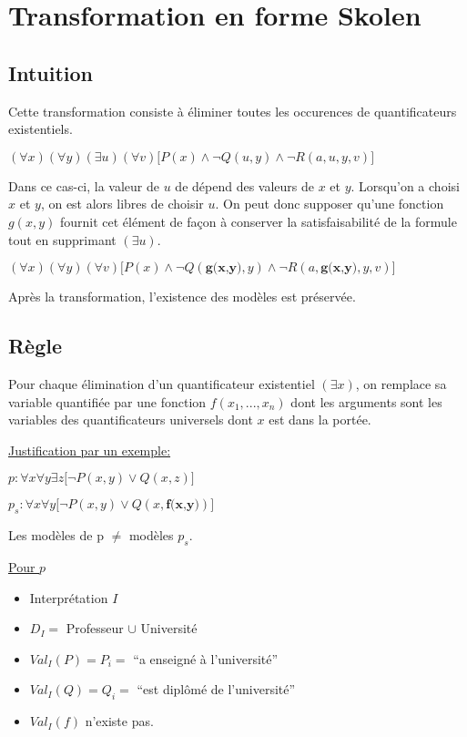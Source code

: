 \section{Transformation en forme Skolen}
\subsection{Intuition}

Cette transformation consiste à éliminer toutes les occurences de quantificateurs existentiels.
\smallskip

$(\forall x)(\forall y)(\exists u)(\forall v) \big[ P(x) \wedge \neg Q(u,y) \wedge \neg R(a,u,y,v) \big]$
\smallskip 


Dans ce cas-ci, la valeur de $u$ de dépend des valeurs de $x$ et $y$. Lorsqu'on a choisi $x$ et $y$, on est alors libres de choisir $u$.
On peut donc supposer qu'une fonction $g(x,y)$ fournit cet élément de façon à conserver la satisfaisabilité de la formule tout en supprimant $(\exists u)$.
\smallskip

$(\forall x)(\forall y)(\forall v) \big[ P(x) \wedge \neg Q(\textbf{g(x,y)},y) \wedge \neg R(a,\textbf{g(x,y)},y,v) \big]$
\smallskip

Après la transformation, l'existence des modèles est préservée.

\subsection{Règle}

Pour chaque élimination d'un quantificateur existentiel $(\exists x)$, on remplace sa variable quantifiée par une fonction $f(x_1,...,x_n)$ dont les arguments sont les variables des quantificateurs universels dont $x$ est dans la portée.
\smallskip

\underline{Justification par un exemple:}

$p: \forall x \forall y \exists z \big[ \neg P(x,y) \vee Q(x,z) \big]$
\smallskip

$p_s: \forall x \forall y \big[ \neg P(x,y) \vee Q(x,\textbf{f(x,y)}) \big]$
\smallskip

Les modèles de p $\neq$ modèles $p_s$.

\underline{Pour $p$}
\begin{itemize}
  \item Interprétation $I$
  \item $D_I =$ Professeur $\cup$ Université
  \item $Val_I(P) = P_i = $ ``a enseigné à l'université''
  \item $Val_I(Q) = Q_i = $ ``est diplômé de l'université''
  \item $Val_I(f)$ n'existe pas.
\end{itemize}

